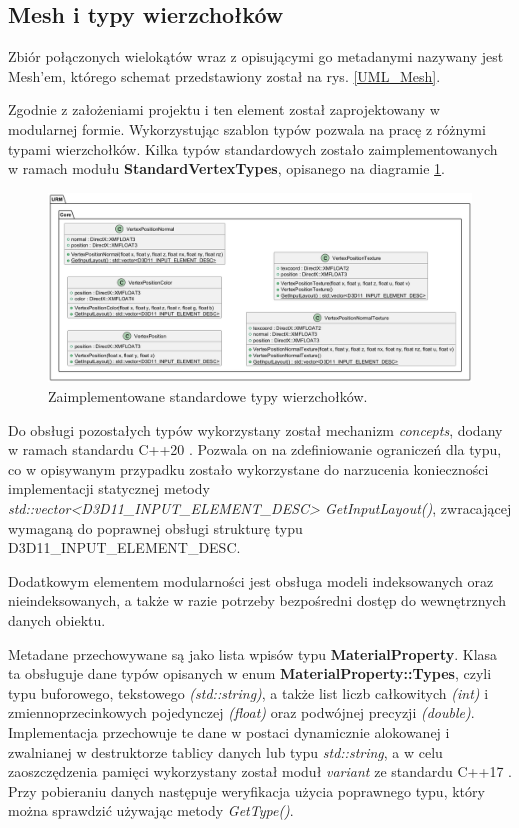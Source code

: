 \subsection{Mesh i typy wierzchołków}
	Zbiór połączonych wielokątów wraz z opisującymi go metadanymi nazywany jest Mesh'em, którego schemat przedstawiony został na rys. \ref{UML_Mesh}.
	
	Zgodnie z założeniami projektu i ten element został zaprojektowany w modularnej formie. Wykorzystując szablon typów pozwala na pracę z różnymi typami wierzchołków. Kilka typów standardowych zostało zaimplementowanych w ramach modułu \textbf{StandardVertexTypes}, opisanego na diagramie \ref{UML_VertexTypes}.
	
	\begin{figure}[h!]
		\centering
		\includegraphics[width=\textwidth]{images/UML/vertextypes.png}
		\caption{Zaimplementowane standardowe typy wierzchołków.}
		\label{UML_VertexTypes}
	\end{figure}
	
	Do obsługi pozostałych typów wykorzystany został mechanizm \textit{concepts}, dodany w ramach standardu C++20 \cite{cpp20:concepts:2025}.
	Pozwala on na zdefiniowanie ograniczeń dla typu, co w opisywanym przypadku zostało wykorzystane do narzucenia konieczności implementacji statycznej metody \textit{std::vector<D3D11\_INPUT\_ELEMENT\_DESC> GetInputLayout()}, zwracającej wymaganą do poprawnej obsługi strukturę typu D3D11\_INPUT\_ELEMENT\_DESC.

	Dodatkowym elementem modularności jest obsługa modeli indeksowanych oraz nieindeksowanych, a także w razie potrzeby bezpośredni dostęp do wewnętrznych danych obiektu.
	
	Metadane przechowywane są jako lista wpisów typu \textbf{MaterialProperty}. Klasa ta obsługuje dane typów opisanych w enum \textbf{MaterialProperty::Types}, czyli typu buforowego, tekstowego \textit{(std::string)}, a także list liczb całkowitych \textit{(int)} i zmiennoprzecinkowych pojedynczej \textit{(float)} oraz podwójnej precyzji \textit{(double)}. Implementacja przechowuje te dane w postaci dynamicznie alokowanej i zwalnianej w destruktorze tablicy danych lub typu \textit{std::string}, a w celu zaoszczędzenia pamięci wykorzystany został moduł \textit{variant} ze standardu C++17 \cite{cpp17:variant:2025}. Przy pobieraniu danych następuje weryfikacja użycia poprawnego typu, który można sprawdzić używając metody \textit{GetType()}.
	
